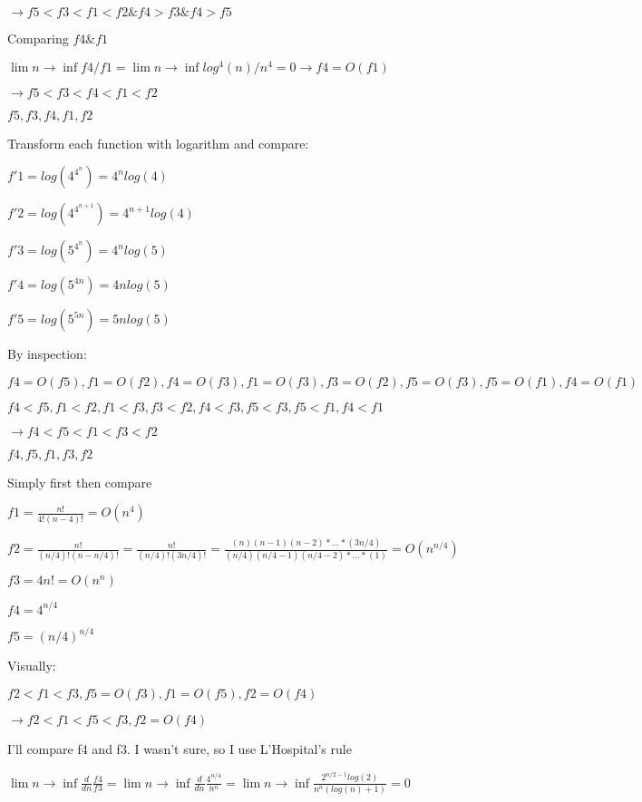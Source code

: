 \documentclass[12pt,twoside]{article}
\begin{document}
\begin{problems}
\begin{problemparts}
$ \rightarrow f5 < f3 < f1 < f2 \& f4 > f3 \& f4 > f5 $

Comparing $f4 \& f1$

$ \lim n \rightarrow \inf f4/f1 = \lim n \rightarrow \inf log^{4}(n) / n^{4} = 0 \rightarrow f4 = O(f1) $

$ \rightarrow f5 < f3 < f4 < f1 < f2$

$f5, f3, f4, f1, f2$

\problempart  %
Transform each function with logarithm and compare:

$f'1 = log(4^{4^{n}}) = 4^{n}log(4)$

$f'2 = log(4^{4^{n + 1}}) = 4^{n+1}log(4)$

$f'3 = log(5^{4^{n}}) = 4^{n}log(5)$

$f'4 = log(5^{4n}) = 4nlog(5)$

$f'5 = log(5^{5n})= 5nlog(5)$

By inspection:

$ f4 = O(f5), f1 = O(f2), f4 = O(f3), f1 = O(f3), f3 = O(f2), f5 = O(f3), f5 = O(f1), f4 = O(f1) $

$ f4 < f5, f1 < f2, f1 < f3, f3 < f2, f4 < f3, f5 < f3, f5 < f1, f4 < f1$

$ \rightarrow f4 < f5 < f1 < f3 < f2$

$ f4, f5, f1, f3, f2$

\problempart  Simply first then compare %

$ f1 = \frac{n!}{4!(n-4)!} = O(n^{4}) $


$ f2 = \frac{n!}{(n/4)!(n-n/4)!} = \frac{n!}{(n/4)!(3n/4)!}  = \frac{(n)(n-1)(n-2)*...*(3n/4)}{(n/4)(n/4 -1)(n/4 - 2)*...*(1)} = O(n^{n/4})$

$ f3 = 4n! = O(n^n)$

$ f4 = 4^{n/4} $

$ f5 = (n/4)^{n/4} $

Visually:

$ f2 < f1 < f3, f5 = O(f3), f1 = O(f5), f2 = O(f4) $

$ \rightarrow f2 < f1 < f5 < f3, f2 = O(f4) $

I'll compare f4 and f3. I wasn't sure, so I use L'Hospital's rule

$ \lim n \rightarrow \inf \frac{d}{dn} \frac{f4}{f3} = \lim n \rightarrow \inf \frac{d}{dn} \frac{4^{n/4}}{n^n} = \lim n \rightarrow \inf \frac{2^{n/2 -1}log(2)}{n^n(log(n) + 1)} = 0 $


\end{problemparts}
\end{problems}
\end{document}
